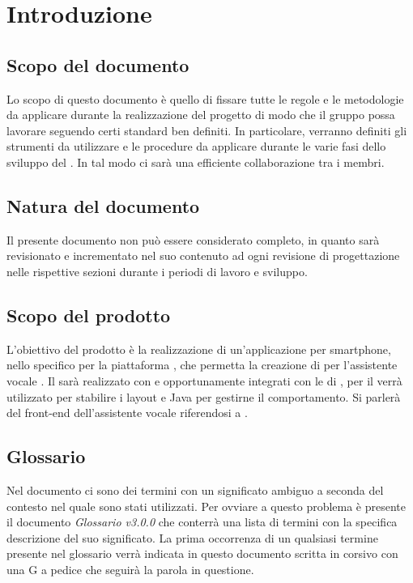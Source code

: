 \section{Introduzione}
\label{sec:intro}
\subsection{Scopo del documento}
Lo scopo di questo documento è quello di fissare tutte le regole e le metodologie da applicare durante la realizzazione del progetto di modo che il gruppo possa lavorare seguendo certi standard ben definiti. In particolare, verranno definiti gli strumenti da utilizzare e le procedure da applicare durante le varie fasi dello sviluppo del . In tal modo ci sarà una efficiente collaborazione tra i membri.
\subsection{Natura del documento}
Il presente documento non può essere considerato completo, in quanto sarà revisionato e incrementato nel suo contenuto ad ogni revisione di progettazione nelle rispettive sezioni durante i periodi di lavoro e sviluppo.
\subsection{Scopo del prodotto}
L'obiettivo del prodotto è la realizzazione di un'applicazione per smartphone, nello specifico per la piattaforma , che permetta la creazione di  per l'assistente vocale  . Il  sarà realizzato con  e  opportunamente integrati con le  di , per il  verrà utilizzato  per stabilire i layout e Java per gestirne il comportamento. Si parlerà del front-end dell'assistente vocale riferendosi a .
\subsection{Glossario}
Nel documento ci sono dei termini con un significato ambiguo a seconda del contesto nel quale sono stati utilizzati. Per ovviare a questo problema è presente il documento \emph{Glossario v3.0.0} che conterrà una lista di termini con la specifica descrizione del suo significato. La prima occorrenza di un qualsiasi termine presente nel glossario verrà indicata in questo documento scritta in corsivo con una G a pedice che seguirà la parola in questione.
